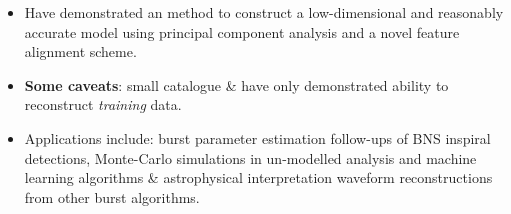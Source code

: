 \documentclass[a0,landscape]{a0poster}
\begin{document}
\begin{multicols}{4}
\begin{itemize}
\item Have demonstrated an method to construct a low-dimensional and reasonably
    accurate model using principal component analysis and a novel feature
    alignment scheme.
\item {\bf Some caveats}: small catalogue \& have only demonstrated ability to
    reconstruct \emph{training} data.
\item Applications include: burst parameter estimation follow-ups of BNS inspiral
    detections, Monte-Carlo simulations in un-modelled analysis
    and machine learning algorithms \& astrophysical interpretation waveform
    reconstructions from other burst algorithms.
\end{itemize}




\small{
}





\end{multicols}
\end{document}
